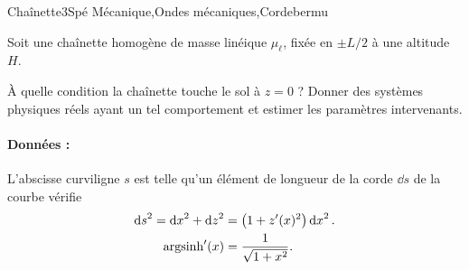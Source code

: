 
\begin{exercise}{Chaînette}{3}{Spé}
{Mécanique,Ondes mécaniques,Corde}{bermu}

Soit une chaînette homogène de masse linéique $\mu_\ell$, fixée en $\pm L/2$ à une altitude $H$.

À quelle condition la chaînette touche le sol à $z = 0$ ? Donner des systèmes physiques réels ayant un tel comportement et estimer les paramètres intervenants.

\paragraph{Données :} L’abscisse curviligne $s$ est telle qu’un élément de longueur de la corde $\dd{s}$ de la courbe vérifie
\begin{align*}
    \dd{s}^2 = \dd{x}^2 + \dd{z}^2 &= \qty(1+ z'(x)^2)\dd{x}^2. \\
    \mathrm{argsinh}'(x) &= \dfrac1{\sqrt{1+x^2}}.
\end{align*}
\end{exercise}
